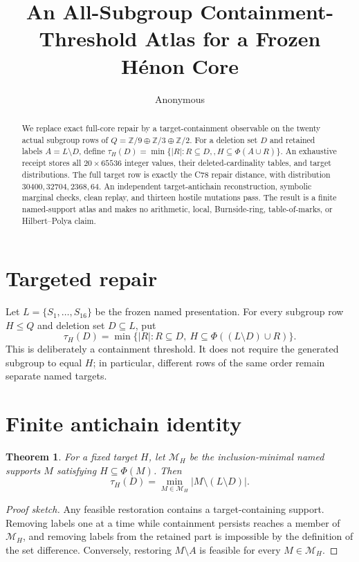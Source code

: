 \documentclass[10pt]{article}
\title{An All-Subgroup Containment-Threshold Atlas for a Frozen H\'enon Core}
\author{Anonymous}
\date{}
\newtheorem{theorem}{Theorem}
\newcommand{\Q}{Q}
\newcommand{\Phiop}{\Phi}
\begin{document}
\maketitle

\begin{abstract}
We replace exact full-core repair by a target-containment observable on the
twenty actual subgroup rows of
$\Q=\mathbb Z/9\oplus\mathbb Z/3\oplus\mathbb Z/2$.  For a deletion set
$D$ and retained labels $A=L\setminus D$, define
$\tau_H(D)=\min\{|R|:R\subseteq D,,H\subseteq\Phiop(A\cup R)\}$.
An exhaustive receipt stores all $20\times65536$ integer values, their
deleted-cardinality tables, and target distributions.  The full target row
is exactly the C78 repair distance, with distribution
$30400,32704,2368,64$.  An independent target-antichain reconstruction,
symbolic marginal checks, clean replay, and thirteen hostile mutations pass.
The result is a finite named-support atlas and makes no arithmetic, local,
Burnside-ring, table-of-marks, or Hilbert--Polya claim.
\end{abstract}

\section{Targeted repair}
Let $L=\{S_1,\ldots,S_{16}\}$ be the frozen named presentation.  For every
subgroup row $H\leq\Q$ and deletion set $D\subseteq L$, put
\[
 \tau_H(D)=\min\{|R|:R\subseteq D,\ H\subseteq
 \Phiop((L\setminus D)\cup R)\}.
\]
This is deliberately a containment threshold.  It does not require the
generated subgroup to equal $H$; in particular, different rows of the same
order remain separate named targets.

\section{Finite antichain identity}
\begin{theorem}
For a fixed target $H$, let $\mathcal M_H$ be the inclusion-minimal named
supports $M$ satisfying $H\subseteq\Phiop(M)$.  Then
\[
  \tau_H(D)=\min_{M\in\mathcal M_H}|M\setminus(L\setminus D)|.
\]
\end{theorem}
\begin{proof}[Proof sketch]
Any feasible restoration contains a target-containing support.  Removing
labels one at a time while containment persists reaches a member of
$\mathcal M_H$, and removing labels from the retained part is impossible by
the definition of the set difference.  Conversely, restoring $M\setminus A$
is feasible for every $M\in\mathcal M_H$.
\end{proof}
\end{document}
